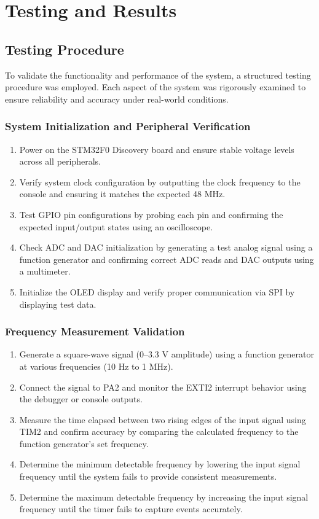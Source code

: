 \section{Testing and Results}
\subsection{Testing Procedure}
To validate the functionality and performance of the system, a structured testing procedure was employed. Each aspect of the system was rigorously examined to ensure reliability and accuracy under real-world conditions.

\subsubsection{System Initialization and Peripheral Verification}
\begin{enumerate}[leftmargin=2em]
    \item Power on the STM32F0 Discovery board and ensure stable voltage levels across all peripherals.
    \item Verify system clock configuration by outputting the clock frequency to the console and ensuring it matches the expected 48 MHz.
    \item Test GPIO pin configurations by probing each pin and confirming the expected input/output states using an oscilloscope.
    \item Check ADC and DAC initialization by generating a test analog signal using a function generator and confirming correct ADC reads and DAC outputs using a multimeter.
    \item Initialize the OLED display and verify proper communication via SPI by displaying test data.
\end{enumerate}

\subsubsection{Frequency Measurement Validation}
\begin{enumerate}[leftmargin=2em]
    \item Generate a square-wave signal (0–3.3 V amplitude) using a function generator at various frequencies (10 Hz to 1 MHz).
    \item Connect the signal to PA2 and monitor the EXTI2 interrupt behavior using the debugger or console outputs.
    \item Measure the time elapsed between two rising edges of the input signal using TIM2 and confirm accuracy by comparing the calculated frequency to the function generator's set frequency.
    \item Determine the minimum detectable frequency by lowering the input signal frequency until the system fails to provide consistent measurements.
    \item Determine the maximum detectable frequency by increasing the input signal frequency until the timer fails to capture events accurately.
\end{enumerate}

